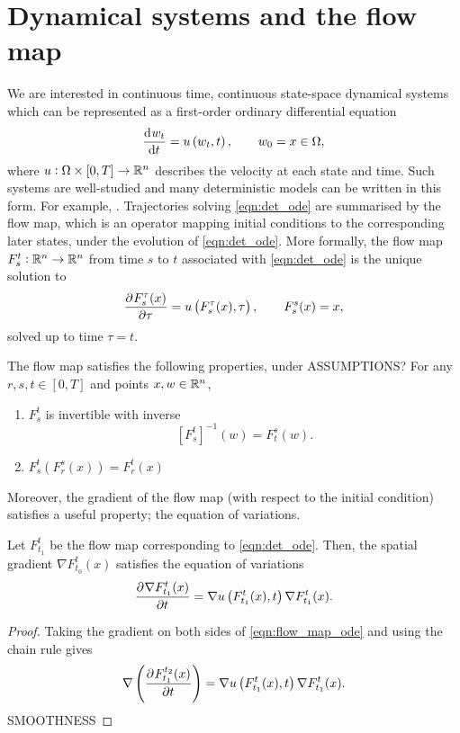 \section{Dynamical systems and the flow map}
We are interested in continuous time, continuous state-space dynamical systems which can be represented as a first-order ordinary differential equation
\begin{equation}
	\dod{w_t}{t} = u\left(w_t, t\right), \qquad w_0 = x \in \Omega,
	\label{eqn:det_ode}
\end{equation}
where \(u: \Omega \times[0,T] \to \mathbb{R}^n\) describes the velocity at each state and time.
Such systems are well-studied and many deterministic models can be written in this form.
For example, \citehere.
Trajectories solving \eqref{eqn:det_ode} are summarised by the flow map, which is an operator mapping initial conditions to the corresponding later states, under the evolution of \eqref{eqn:det_ode}.
More formally, the flow map \(F_{s}^{t}: \mathbb{R}^n \to \mathbb{R}^n\) from time \(s\) to \(t\) associated with \eqref{eqn:det_ode} is the unique solution to
\begin{equation}
	\dpd{F_{s}^{\tau}(x)}{\tau} = u\left(F_{s}^\tau(x), \tau\right), \qquad F_{s}^{s}(x) = x,
	\label{eqn:flow_map_ode}
\end{equation}
solved up to time \(\tau = t\).

The flow map satisfies the following properties, under ASSUMPTIONS?
For any \(r, s, t \in [0,T]\) and points \(x,w \in \mathbb{R}^n\),
\begin{enumerate}
	\item \(F_{s}^{t}\) is invertible with inverse
	      \[
		      \left[F_{s}^{t}\right]^{-1}\left(w\right) = F_{t}^{s}\left(w\right).
	      \]
	\item \(F_s^{t}\left(F_{r}^{s}(x)\right) = F_{r}^{t}\left(x\right)\)
\end{enumerate}
Moreover, the gradient of the flow map (with respect to the initial condition) satisfies a useful property; the equation of variations.
\begin{theorem}
	Let \(F_{t_1}^{t}\) be the flow map corresponding to \eqref{eqn:det_ode}.
	Then, the spatial gradient \(\nabla F_{t_0}^t(x)\) satisfies the equation of variations
	\begin{equation}
		\dpd{\nabla F_{t_1}^{t}(x)}{t} = \nabla u\left(F_{t_1}^{t}(x), t\right) \nabla F_{t_1}^{t}(x).
		\label{eqn:eqn_of_variations}
	\end{equation}
\end{theorem}
\begin{proof}
	Taking the gradient on both sides of \eqref{eqn:flow_map_ode} and using the chain rule gives
	\[
		\nabla\left(\dpd{F_{t_1}^{t_2}(x)}{t}\right) = \nabla u\left(F_{t_1}^{t}(x), t\right) \nabla F_{t_1}^{t}(x).
	\]
	SMOOTHNESS
\end{proof}


